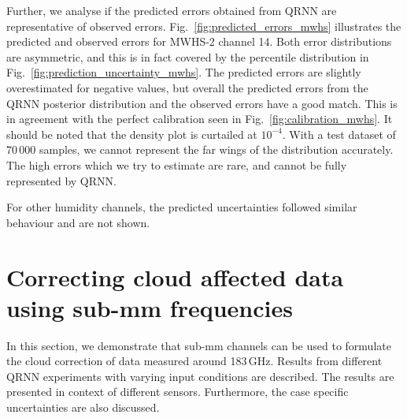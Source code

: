 \documentclass[amt, manuscript]{copernicus}
\begin{document}
Further, we analyse if the  predicted errors obtained from QRNN are representative of observed errors. Fig.~\ref{fig:predicted_errors_mwhs} illustrates the predicted and observed errors for MWHS-2 channel 14. Both error distributions are asymmetric, and this is in fact covered by the percentile distribution  in Fig.~\ref{fig:prediction_uncertainty_mwhs}. The predicted errors are slightly overestimated for negative values, but overall the predicted errors from the QRNN posterior distribution and the observed errors have a good match. This is in agreement with the perfect calibration seen in Fig.~\ref{fig:calibration_mwhs}. It should be noted that the density plot is curtailed at $10^{-4}$. With a test dataset of 70\,000 samples, we cannot represent the far wings of the distribution accurately. The high errors which we try to estimate are rare, and cannot be fully represented by QRNN. 

For other humidity channels, the predicted uncertainties followed similar behaviour and are not shown. 


\section{Correcting cloud affected data using sub-mm frequencies}
\label{qrnn_ici}
In this section, we demonstrate that sub-mm channels can be used to formulate the cloud correction of data measured around 183\,GHz. Results from different QRNN experiments with varying input conditions are described. The results are presented in context of different sensors. Furthermore, the case specific uncertainties are also discussed.
\end{document}
